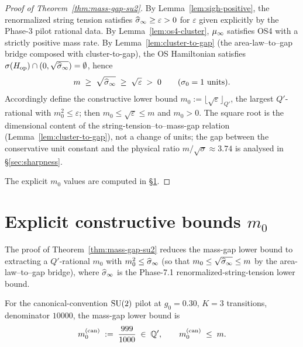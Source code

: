 \begin{proof}[Proof of Theorem~\ref{thm:mass-gap-su2}]
By Lemma~\ref{lem:sigh-positive}, the renormalized string tension
satisfies $\widehat{\sigma}_\infty \ge \varepsilon > 0$ for $\varepsilon$ given
explicitly by the Phase-3 pilot rational data.  By
Lemma~\ref{lem:os4-cluster}, $\mu_\infty$ satisfies OS4 with a strictly
positive mass rate.  By Lemma~\ref{lem:cluster-to-gap} (the
area-law--to--gap bridge composed with cluster-to-gap), the OS
Hamiltonian satisfies $\sigma(H_{\mathrm{op}}) \cap (0, \sqrt{\widehat{\sigma}_\infty}) =
\emptyset$, hence
\begin{equation*}
  m \;\ge\; \sqrt{\widehat{\sigma}_\infty} \;\ge\; \sqrt{\varepsilon} \;>\; 0
  \qquad (\sigma_0 = 1 \text{ units}).
\end{equation*}
Accordingly define the constructive lower bound
$m_0 := \lfloor \sqrt{\varepsilon} \rfloor_{Q'}$, the largest
$Q'$-rational with $m_0^2 \le \varepsilon$; then $m_0 \le
\sqrt{\varepsilon} \le m$ and $m_0 > 0$.  The square root is the
dimensional content of the string-tension--to--mass-gap relation
(Lemma~\ref{lem:cluster-to-gap}), not a change of units; the gap
between the conservative unit constant and the physical ratio
$m/\sqrt{\sigma}\approx 3.74$ is analysed in \S\ref{sec:sharpness}.

The explicit $m_0$ values are computed in \S\ref{sec:explicit-bounds}.
\end{proof}

\section{Explicit constructive bounds $m_0$}
\label{sec:explicit-bounds}

The proof of Theorem~\ref{thm:mass-gap-su2} reduces the mass-gap
lower bound to extracting a $Q'$-rational $m_0$ with
$m_0^2 \le \widehat{\sigma}_\infty$ (so that $m_0 \le \sqrt{\widehat{\sigma}_\infty} \le m$ by the
area-law--to--gap bridge), where $\widehat{\sigma}_\infty$ is the Phase-7.1
renormalized-string-tension lower bound.

\begin{proposition}
\label{prop:m0-canonical}
For the canonical-convention $\mathrm{SU}(2)$ pilot at $g_0 = 0.30$,
$K = 3$ transitions, denominator $10000$, the mass-gap lower bound is
\begin{equation*}
  m_0^{(\mathrm{can})} \;:=\; \frac{999}{1000} \;\in\; \mathbb{Q}',
  \qquad
  m_0^{(\mathrm{can})} \;\le\; m.
\end{equation*}
\end{proposition}

